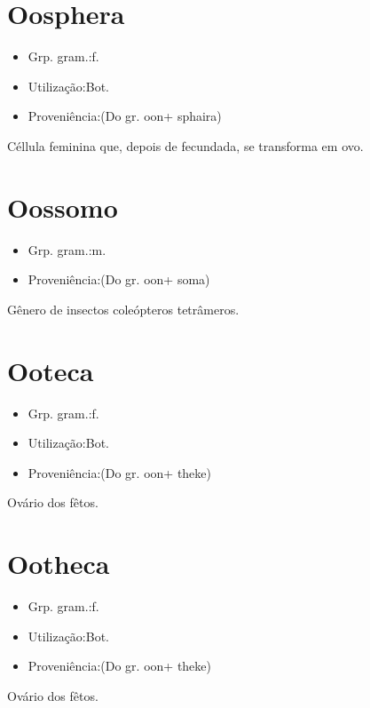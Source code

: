\section{Oosphera}
\begin{itemize}
\item {Grp. gram.:f.}
\end{itemize}
\begin{itemize}
\item {Utilização:Bot.}
\end{itemize}
\begin{itemize}
\item {Proveniência:(Do gr. \textunderscore oon\textunderscore  + \textunderscore sphaira\textunderscore )}
\end{itemize}
Céllula feminina que, depois de fecundada, se transforma em ovo.
\section{Oossomo}
\begin{itemize}
\item {Grp. gram.:m.}
\end{itemize}
\begin{itemize}
\item {Proveniência:(Do gr. \textunderscore oon\textunderscore  + \textunderscore soma\textunderscore )}
\end{itemize}
Gênero de insectos coleópteros tetrâmeros.
\section{Ooteca}
\begin{itemize}
\item {Grp. gram.:f.}
\end{itemize}
\begin{itemize}
\item {Utilização:Bot.}
\end{itemize}
\begin{itemize}
\item {Proveniência:(Do gr. \textunderscore oon\textunderscore  + \textunderscore theke\textunderscore )}
\end{itemize}
Ovário dos fêtos.
\section{Ootheca}
\begin{itemize}
\item {Grp. gram.:f.}
\end{itemize}
\begin{itemize}
\item {Utilização:Bot.}
\end{itemize}
\begin{itemize}
\item {Proveniência:(Do gr. \textunderscore oon\textunderscore  + \textunderscore theke\textunderscore )}
\end{itemize}
Ovário dos fêtos.
